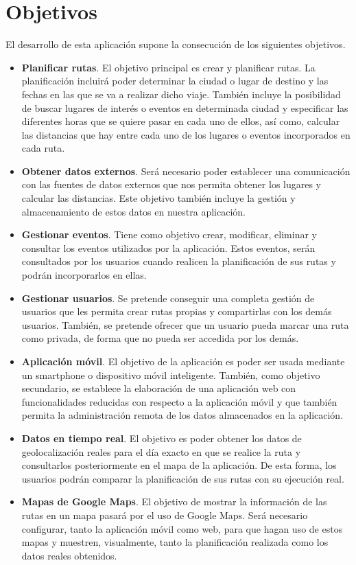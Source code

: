 \section{Objetivos}
El desarrollo de esta aplicación supone la consecución de los siguientes objetivos.

\begin{itemize}

	\item \textbf{Planificar rutas}. El objetivo principal es crear y planificar rutas. La planificación incluirá poder determinar la ciudad o lugar de destino y las fechas en las que se va a realizar dicho viaje. También incluye la posibilidad de buscar lugares de interés o eventos en determinada ciudad y especificar las diferentes horas que se quiere pasar en cada uno de ellos, así como, calcular las distancias que hay entre cada uno de los lugares o eventos incorporados en cada ruta.
	\item \textbf{Obtener datos externos}. Será necesario poder establecer una comunicación con las fuentes de datos externos que nos permita obtener los lugares y calcular las distancias. Este objetivo también incluye la gestión y almacenamiento de estos datos en nuestra aplicación.
	\item \textbf{Gestionar eventos}. Tiene como objetivo crear, modificar, eliminar y consultar los eventos utilizados por la aplicación. Estos eventos, serán consultados por los usuarios cuando realicen la planificación de sus rutas y podrán incorporarlos en ellas.
	\item \textbf{Gestionar usuarios}. Se pretende conseguir una completa gestión de usuarios que les permita crear rutas propias y compartirlas con los demás usuarios. También, se pretende ofrecer que un usuario pueda marcar una ruta como privada, de forma que no pueda ser accedida por los demás.
	\item \textbf{Aplicación móvil}. El objetivo de la aplicación es poder ser usada mediante un smartphone o dispositivo móvil inteligente. También, como objetivo secundario, se establece la elaboración de una aplicación web con funcionalidades reducidas con respecto a la aplicación móvil y que también permita la administración remota de los datos almacenados en la aplicación.
	\item \textbf{Datos en tiempo real}. El objetivo es poder obtener los datos de geolocalización reales para el día exacto en que se realice la ruta y consultarlos posteriormente en el mapa de la aplicación. De esta forma, los usuarios podrán comparar la planificación de sus rutas con su ejecución real.
	\item \textbf{Mapas de Google Maps}. El objetivo de mostrar la información de las rutas en un mapa pasará por el uso de Google Maps. Será necesario configurar, tanto la aplicación móvil como web, para que hagan uso de estos mapas y muestren, visualmente, tanto la planificación realizada como los datos reales obtenidos.
	
\end{itemize}


